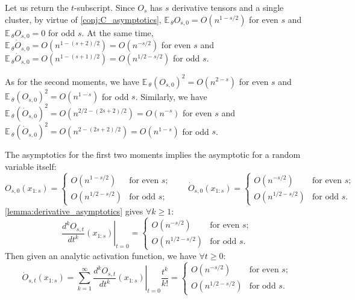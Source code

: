 \documentclass{article}
\newcommand{\EE}{\mathbb{E}\,}
\begin{document}
    Let us return the $t$-subscript.
    Since $O_s$ has $s$ derivative tensors and a single cluster, by virtue of \cref{conj:C_asymptotics}, $\EE_\theta O_{s,0} = O(n^{1 - s/2})$ for even $s$ and $\EE_\theta O_{s,0} = 0$ for odd $s$.
    At the same time, $\EE_\theta \dot O_{s,0} = O(n^{1 - (s+2)/2}) = O(n^{-s/2})$ for even $s$ and $\EE_\theta \dot O_{s,0} = O(n^{1 - (s+1)/2}) = O(n^{1/2 - s/2})$ for odd $s$.

    As for the second moments, we have $\EE_\theta (O_{s,0})^2 = O(n^{2 - s})$ for even $s$ and $\EE_\theta (O_{s,0})^2 = O(n^{1 - s})$ for odd $s$.
    Similarly, we have $\EE_\theta (\dot O_{s,0})^2 = O(n^{2/2 - (2s+2)/2}) = O(n^{-s})$ for even $s$ and $\EE_\theta (\dot O_{s,0})^2 = O(n^{2 - (2s+2)/2}) = O(n^{1 - s})$ for odd $s$.

    The asymptotics for the first two moments implies the asymptotic for a random variable itself:
    \begin{equation}
        O_{s,0}(x_{1:s}) =
        \begin{cases}
            O(n^{1 - s/2}) &\text{for even $s$;}
            \\
            O(n^{1/2 - s/2}) &\text{for odd $s$;}
        \end{cases}
        \qquad
        \dot O_{s,0}(x_{1:s}) =
        \begin{cases}
            O(n^{-s/2}) &\text{for even $s$;}
            \\
            O(n^{1/2 - s/2}) &\text{for odd $s$.}
        \end{cases}
    \end{equation}
    \cref{lemma:derivative_asymptotics} gives $\forall k \geq 1$:
    \begin{equation}
        \left.\frac{d^k O_{s,t}}{dt^k}(x_{1:s})\right|_{t=0} =
        \begin{cases}
            O(n^{-s/2}) &\text{for even $s$;}
            \\
            O(n^{1/2 - s/2}) &\text{for odd $s$.}
        \end{cases}
    \end{equation}
    Then given an analytic activation function, we have $\forall t \geq 0$:
    \begin{equation}
        \dot O_{s,t}(x_{1:s}) =
        \sum_{k=1}^\infty \left.\frac{d^k O_{s,t}}{dt^k}(x_{1:s})\right|_{t=0} \frac{t^k}{k!} =
        \begin{cases}
            O(n^{-s/2}) &\text{for even $s$;}
            \\
            O(n^{1/2 - s/2}) &\text{for odd $s$.}
        \end{cases}
    \end{equation}
\end{document}
